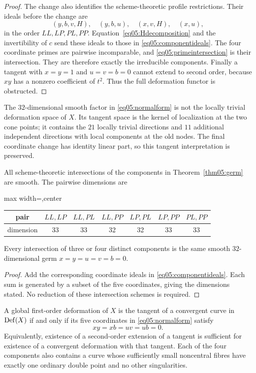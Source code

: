 \begin{proof}
The change also identifies the scheme-theoretic profile restrictions.
Their ideals before the change are
\[
 (y,b,v,H),\quad(y,b,u),\quad(x,v,H),\quad(x,u),
\]
in the order $LL,LP,PL,PP$.  Equation~\eqref{eq05:Hdecomposition} and the
invertibility of $c$ send these ideals to those in
\eqref{eq05:componentideals}.  The four coordinate primes are pairwise
incomparable, and \eqref{eq05:primeintersection} is their intersection.
They are therefore exactly the irreducible components.
Finally a tangent with $x=y=1$ and $u=v=b=0$ cannot extend to second
order, because $xy$ has a nonzero coefficient of $t^2$.  Thus the full
deformation functor is obstructed.
\end{proof}

The $32$-dimensional smooth factor in \eqref{eq05:normalform} is not the
locally trivial deformation space of $X$.  Its tangent space is the
kernel of localization at the two cone points; it contains the $21$
locally trivial directions and $11$ additional independent directions
with local components at the old nodes.  The final coordinate change
has identity linear part, so this tangent interpretation is preserved.

\begin{corollary}\label{cor05:intersections}
All scheme-theoretic intersections of the components in
Theorem~\ref{thm05:germ} are smooth.  The pairwise dimensions are
\begin{center}
\begin{adjustbox}{max width=\textwidth,center}
\begin{tabular}{c c c c c c c}
\toprule
pair&$LL,LP$&$LL,PL$&$LL,PP$&$LP,PL$&$LP,PP$&$PL,PP$\\
\midrule
dimension&33&33&32&32&33&33\\
\bottomrule
\end{tabular}
\end{adjustbox}
\end{center}
Every intersection of three or four distinct components is the same
smooth $32$-dimensional germ $x=y=u=v=b=0$.
\end{corollary}

\begin{proof}
Add the corresponding coordinate ideals in
\eqref{eq05:componentideals}.  Each sum is generated by a subset of the
five coordinates, giving the dimensions stated.  No reduction of these
intersection schemes is required.
\end{proof}

\begin{corollary}\label{cor05:integrability}
A global first-order deformation of $X$ is the tangent of a convergent
curve in $\operatorname{Def}(X)$ if and only if its five coordinates in
\eqref{eq05:normalform} satisfy
\[
 xy=xb=uv=ub=0.
\]
Equivalently, existence of a second-order extension of a tangent is
sufficient for existence of a convergent deformation with that tangent.
Each of the four components also contains a curve whose sufficiently
small noncentral fibres have exactly one ordinary double point and no
other singularities.
\end{corollary}

